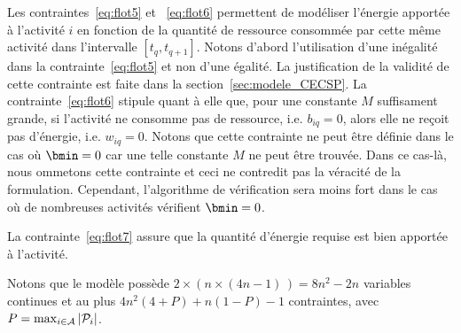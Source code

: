 Les contraintes~\eqref{eq:flot5} et ~\eqref{eq:flot6} permettent de
modéliser l’énergie apportée à l’activité $i$ en fonction de la
quantité de ressource consommée par cette même activité dans
l’intervalle $[t_q , t_{q+1}]$. Notons d’abord l’utilisation d’une
inégalité dans la contrainte~\eqref{eq:flot5} et non d’une égalité. La
justification de la validité de cette contrainte est faite dans la
section~\ref{sec:modele_CECSP}. La contrainte~\eqref{eq:flot6}
stipule quant à elle que, pour une constante $M$ suffisament grande,
si l'activité ne consomme pas de ressource, i.e. $b_{iq}=0$, alors
elle ne reçoit pas d'énergie, i.e. $w_{iq}=0$. Notons que cette
contrainte ne peut être définie dans le cas où $\bmin = 0$ car une
telle constante $M$ ne peut être trouvée. Dans ce
cas-là, nous ommetons cette contrainte et ceci ne contredit pas la
véracité de la formulation. Cependant, l'algorithme de vérification
sera moins fort dans le cas où de nombreuses activités vérifient
$\bmin=0$. 

La contrainte~\eqref{eq:flot7} assure que la quantité d'énergie
requise est bien apportée à l'activité. 

Notons que le modèle possède $2 \times (n \times (4n - 1)\,) = 8n^2 -
2n$ variables continues et au plus $4n^2(4+P) + n (1 -
P) - 1$ contraintes, avec $P=\max_{i\in{\cal A}}|{\cal P}_i|$.


